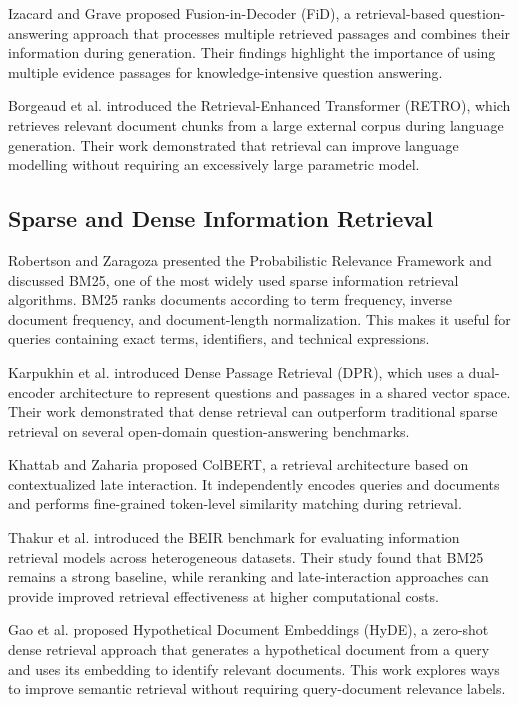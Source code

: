 \documentclass[conference]{IEEEtran}
\begin{document}
Izacard and Grave \cite{FiD2021} proposed Fusion-in-Decoder
(FiD), a retrieval-based question-answering approach
that processes multiple retrieved passages and combines
their information during generation. Their findings
highlight the importance of using multiple evidence
passages for knowledge-intensive question answering.

Borgeaud et al. \cite{RETRO2022} introduced the
Retrieval-Enhanced Transformer (RETRO), which retrieves
relevant document chunks from a large external corpus
during language generation. Their work demonstrated
that retrieval can improve language modelling without
requiring an excessively large parametric model.

\subsection{Sparse and Dense Information Retrieval}

Robertson and Zaragoza \cite{Robertson2009} presented
the Probabilistic Relevance Framework and discussed
BM25, one of the most widely used sparse information
retrieval algorithms. BM25 ranks documents according
to term frequency, inverse document frequency, and
document-length normalization. This makes it useful
for queries containing exact terms, identifiers, and
technical expressions.

Karpukhin et al. \cite{Karpukhin2020} introduced
Dense Passage Retrieval (DPR), which uses a
dual-encoder architecture to represent questions
and passages in a shared vector space. Their work
demonstrated that dense retrieval can outperform
traditional sparse retrieval on several open-domain
question-answering benchmarks.

Khattab and Zaharia \cite{ColBERT2020} proposed
ColBERT, a retrieval architecture based on contextualized
late interaction. It independently encodes queries
and documents and performs fine-grained token-level
similarity matching during retrieval.

Thakur et al. \cite{BEIR2021} introduced the BEIR
benchmark for evaluating information retrieval models
across heterogeneous datasets. Their study found that
BM25 remains a strong baseline, while reranking and
late-interaction approaches can provide improved
retrieval effectiveness at higher computational costs.

Gao et al. \cite{HyDE2023} proposed Hypothetical
Document Embeddings (HyDE), a zero-shot dense retrieval
approach that generates a hypothetical document from
a query and uses its embedding to identify relevant
documents. This work explores ways to improve semantic
retrieval without requiring query-document relevance
labels.
\end{document}
